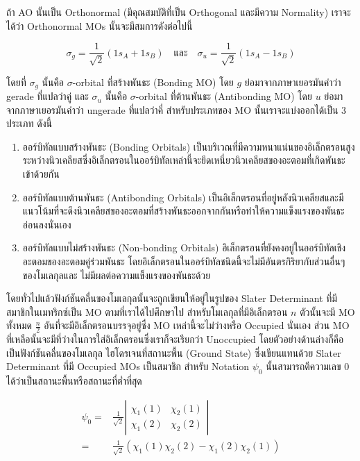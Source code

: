 ถ้า AO นั้นเป็น Orthonormal (มีคุณสมบัติที่เป็น Orthogonal และมีความ Normality) เราจะได้ว่า Orthonormal MOs นั้นจะมีสมการดังต่อไปนี้

\begin{equation}
    \sigma_g
    =
    \frac{1}{\sqrt{2}}\left(1 s_A+1 s_B\right)
    \quad \text{และ} \quad
    \sigma_u
    =
    \frac{1}{\sqrt{2}}\left(1 s_A-1 s_B\right)
\end{equation}

\noindent โดยที่ $\sigma_g$ นั้นคือ $\sigma$-orbital ที่สร้างพันธะ (Bonding MO) โดย $g$ ย่อมาจากภาษาเยอรมันคำว่า gerade
ที่แปลว่าคู่ และ $\sigma_u$ นั้นคือ $\sigma$-orbital ที่ต้านพันธะ (Antibonding MO) โดย $u$ ย่อมาจากภาษาเยอรมันคำว่า ungerade
ที่แปลว่าคี่ สำหรับประเภทของ MO นั้นเราจะแบ่งออกได้เป็น 3 ประเภท ดังนี้

\begin{enumerate}
    \item ออร์บิทัลแบบสร้างพันธะ (Bonding Orbitals)
          เป็นบริเวณที่มีความหนาแน่นของอิเล็กตรอนสูงระหว่างนิวเคลียสซึ่งอิเล็กตรอนในออร์บิทัลเหล่านี้จะยึดเหนี่ยวนิวเคลียสของอะตอมที่เกิดพันธะเข้าด้วยกัน

    \item ออร์บิทัลแบบต้านพันธะ (Antibonding Orbitals)
          เป็นอิเล็กตรอนที่อยู่หลังนิวเคลียสและมีแนวโน้มที่จะดึงนิวเคลียสของอะตอมที่สร้างพันธะออกจากกันหรือทำให้ความแข็งแรงของพันธะอ่อนลงนั่นเอง

    \item ออร์บิทัลแบบไม่สร้างพันธะ (Non-bonding Orbitals)
          อิเล็กตรอนที่ยังคงอยู่ในออร์บิทัลเชิงอะตอมของอะตอมคู่ร่วมพันธะ โดยอิเล็กตรอนในออร์บิทัลชนิดนี้จะไม่มีอันตรกิริยากับส่วนอื่นๆของโมเลกุลและ%
          ไม่มีผลต่อความแข็งแรงของพันธะด้วย
\end{enumerate}

โดยทั่วไปแล้วฟังก์ชันคลื่นของโมเลกุลนั้นจะถูกเขียนให้อยู่ในรูปของ Slater Determinant ที่มีสมาชิกในเมทริกซ์เป็น MO ตามที่เราได้ไปศึกษาไป
สำหรับโมเลกุลที่มีอิเล็กตรอน $n$ ตัวนั้นจะมี MO ทั้งหมด $\frac{n}{2}$ อันที่จะมีอิเล็กตรอนบรรจุอยู่ซึ่ง MO เหล่านี้จะไม่ว่างหรือ Occupied
นั่นเอง ส่วน MO ที่เหลือนั้นจะมีที่ว่างในการใส่อิเล็กตรอนซึ่งเราก็จะเรียกว่า Unoccupied โดยตัวอย่างด้านล่างก็คือเป็นฟังก์ชันคลื่นของโมเลกุล%
ไฮโดรเจนที่สถานะพื้น (Ground State) ซึ่งเขียนแทนด้วย Slater Determinant ที่มี Occupied MOs เป็นสมาชิก สำหรับ Notation
$\psi_0$ นั้นสามารถตีความเลข 0 ได้ว่าเป็นสถานะพื้นหรือสถานะที่ต่ำที่สุด

\begin{equation}
    \begin{aligned}
        \psi_0
        = &
        \frac{1}{\sqrt{2}}
        \left|
        \begin{array}{ll}
            \chi_1(1) & \chi_2(1) \\
            \chi_1(2) & \chi_2(2)
        \end{array}
        \right| \\
        = &
        \frac{1}{\sqrt{2}}
        \left(
        \chi_1(1) \chi_2(2) - \chi_1(2) \chi_2(1)
        \right)
    \end{aligned}
\end{equation}

